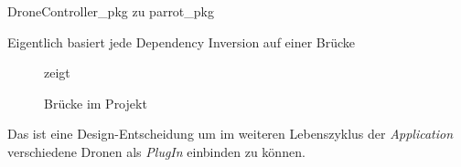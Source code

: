 
DroneController\_pkg zu parrot\_pkg







\glqq Eigentlich basiert jede Dependency Inversion auf einer Brücke\grqq









\begin{figure}[ht!]
\vspace{0.25cm}
\begin{center}
\caption{Brücke im Projekt}
\label{fig:Bridge}
\end{center}

\vspace{0.25cm}
 zeigt \missing\
\end{figure}



Das ist eine Design-Entscheidung um im weiteren Lebenszyklus der \textit{Application} verschiedene Dronen als \textit{PlugIn} einbinden zu können.











